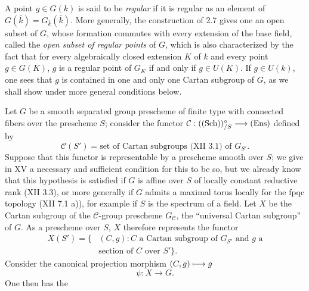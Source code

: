 A point $g\in G(k)$ is said to be \emph{regular} if it is regular as an
element of $G(\bar k)=G_{\bar k}(\bar k)$. More generally, the construction
of 2.7 gives one an open subset of $G$, whose formation commutes with
every extension of the base field, called the \emph{open subset of
regular points} of $G$, which is also characterized by the fact that
for every algebraically closed extension $K$ of $k$ and every point
$g\in G(K)$, $g$ is a regular point of $G_K$ if and only if $g\in U(K)$.
If $g\in U(k)$, one sees that $g$
is contained in one and only one Cartan subgroup of $G$, as we shall
show under more general conditions below.

Let $G$ be a smooth separated group prescheme of finite type with
connected fibers over the prescheme $S$; consider the functor
$\mathcal C:(\textup{(Sch)})^\circ_{/S}\longrightarrow\textup{(Ens)}$ defined by
\[
 \mathcal C(S')=\text{set of Cartan subgroups (XII 3.1) of }G_{S'}.
\]
Suppose that this functor is representable by a prescheme smooth over
$S$; we give in XV a necessary and sufficient condition for this to
be so, but we already know that this hypothesis is satisfied if $G$
is affine over $S$ of locally constant reductive rank (XII 3.3), or
more generally if $G$ admits a maximal torus locally for the fpqc
topology (XII 7.1 a)), for example if $S$ is the spectrum of a field.
Let $X$ be the Cartan subgroup of the $\mathcal C$-group prescheme
$G_{\mathcal C}$, the ``universal Cartan subgroup'' of $G$. As a
prescheme over $S$, $X$ therefore represents the functor
\[
\begin{aligned}
 X(S')=\{&(C,g): C\text{ a Cartan subgroup of }G_{S'}\text{ and }g\text{ a}\\
 &\text{section of }C\text{ over }S'\}.
\end{aligned}
\]
Consider the canonical projection morphism $(C,g)\longmapsto g$
\[
 \psi:X\to G.
\]
One then has the


